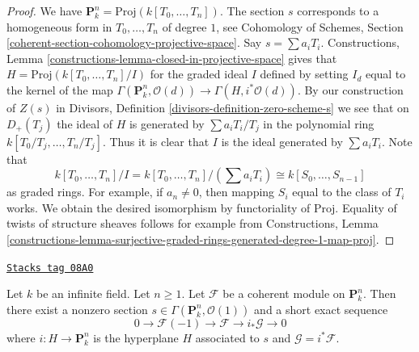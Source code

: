 \begin{proof}
We have $\mathbf{P}^n_k = \text{Proj}(k[T_0, \ldots, T_n])$.
The section $s$ corresponds to a homogeneous form in $T_0, \ldots, T_n$
of degree $1$, see
Cohomology of Schemes, Section
\ref{coherent-section-cohomology-projective-space}.
Say $s = \sum a_i T_i$.
Constructions, Lemma \ref{constructions-lemma-closed-in-projective-space}
gives that
$H = \text{Proj}(k[T_0, \ldots, T_n]/I)$ for the graded ideal $I$
defined by setting $I_d$ equal to the kernel of the map
$\Gamma(\mathbf{P}^n_k, \mathcal{O}(d)) \to \Gamma(H, i^*\mathcal{O}(d))$.
By our construction of $Z(s)$ in Divisors,
Definition \ref{divisors-definition-zero-scheme-s}
we see that on $D_{+}(T_j)$ the ideal of $H$ is generated by
$\sum a_i T_i/T_j$ in the polynomial ring
$k[T_0/T_j, \ldots, T_n/T_j]$. Thus it is clear that $I$ is the ideal
generated by $\sum a_i T_i$. Note that
$$
k[T_0, \ldots, T_n]/I = k[T_0, \ldots, T_n]/(\sum a_i T_i) \cong
k[S_0, \ldots, S_{n - 1}]
$$
as graded rings. For example, if $a_n \not = 0$, then mapping
$S_i$ equal to the class of $T_i$ works. We obtain the desired isomorphism
by functoriality of $\text{Proj}$.
Equality of twists of structure sheaves follows for example from
Constructions, Lemma
\ref{constructions-lemma-surjective-graded-rings-generated-degree-1-map-proj}.
\end{proof}

\begin{lemma}
\label{varieties-lemma-exact-sequence-induction}
\href{https://stacks.math.columbia.edu/tag/08A0}{\texttt{Stacks tag 08A0}}

Let $k$ be an infinite field. Let $n \geq 1$.
Let $\mathcal{F}$ be a coherent module on $\mathbf{P}^n_k$.
Then there exist a nonzero section
$s \in \Gamma(\mathbf{P}^n_k, \mathcal{O}(1))$
and a short exact sequence
$$
0 \to \mathcal{F}(-1) \to \mathcal{F} \to i_*\mathcal{G} \to 0
$$
where $i : H \to \mathbf{P}^n_k$ is the hyperplane $H$ associated to $s$
and $\mathcal{G} = i^*\mathcal{F}$.
\end{lemma}

